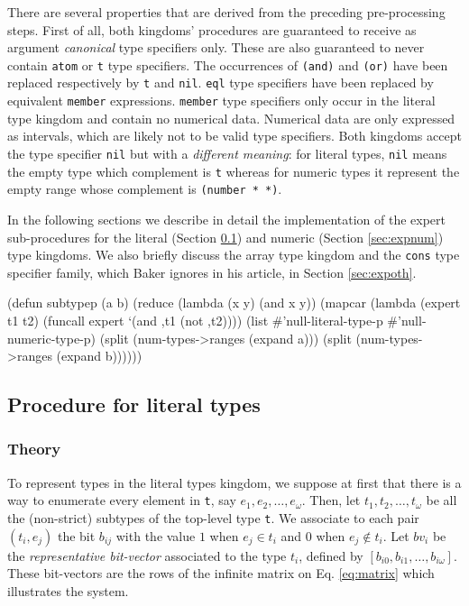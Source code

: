 \documentclass[format=sigconf]{acmart}
\newcommand\code[2][\small]{\sloppy\texttt{#1#2}}
\theoremstyle{definition}
\begin{document}
There are several properties that are derived from the preceding pre-processing
steps. First of all, both kingdoms' procedures are guaranteed to receive as
argument \emph{canonical} type specifiers only. These are also guaranteed to never
contain \code{atom} or \code{t} type specifiers. The occurrences of \code{(and)}
and \code{(or)} have been replaced respectively by \code{t} and \code{nil}.
\code{eql} type specifiers have been replaced by equivalent \code{member} expressions.
\code{member} type specifiers only occur in the literal type kingdom and contain
no numerical data. Numerical data are only expressed as intervals, which are likely
not to be valid type specifiers. Both kingdoms accept the type specifier
\code{nil} but with a \emph{different meaning}: for literal types, \code{nil}
means the empty type which complement is \code{t} whereas for numeric types it
represent the empty range whose complement is \code{(number * *)}.

In the following sections we describe in detail the implementation of the expert
sub-procedures for the literal (Section \ref{sec:explit}) and numeric
(Section \ref{sec:expnum}) type kingdoms. We also briefly discuss
the array type kingdom and the \code{cons} type specifier family,
which Baker ignores in his article, in Section \ref{sec:expoth}.

\begin{listing}
\begin{clcode}
(defun subtypep (a b)
  (reduce (lambda (x y) (and x y))
          (mapcar (lambda (expert t1 t2)
                    (funcall expert `(and ,t1 (not ,t2))))
                  (list #'null-literal-type-p
                        #'null-numeric-type-p)
                  (split (num-types->ranges (expand a)))
                  (split (num-types->ranges (expand b))))))
\end{clcode}
\caption{A top-down approach of \code{subtypep}}
\label{lst:tdstp}
\end{listing}

\subsection{Procedure for literal types}
\label{sec:explit}
\subsubsection{Theory}
To represent types in the literal types kingdom, we suppose at first that there
is a way to enumerate every element in \code{t}, say $e_1, e_2, \dots, e_\omega$.
Then, let $t_1, t_2, \dots, t_\omega$ be all the (non-strict) subtypes of the
top-level type \code{t}. We associate to each pair $\left(t_i, e_j\right)$ the
bit $b_{ij}$ with the value $1$ when $e_j \in t_i$ and $0$ when $e_j \notin t_i$.
Let $bv_i$ be the \emph{representative bit-vector} associated to the type $t_i$,
defined by $\left[b_{i0}, b_{i1}, \dots, b_{i\omega}\right]$. These
bit-vectors are the rows of the infinite matrix on Eq. \ref{eq:matrix} which
illustrates the system.
\end{document}
